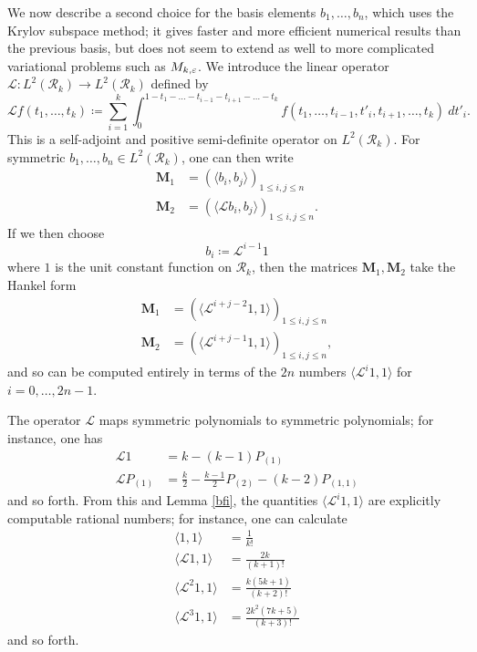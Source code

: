 We now describe a second choice for the basis elements $b_1,\dots,b_n$, which uses the Krylov subspace method; it gives faster and more efficient numerical results than the previous basis, but does not seem to extend as well to more complicated variational problems such as $M_{k,\varepsilon}$.  We introduce the linear operator ${\mathcal L}: L^2({\mathcal R}_k) \to L^2({\mathcal R}_k)$ defined by
$$ {\mathcal L} f( t_1,\dots,t_k) \coloneqq \sum_{i=1}^k \int_0^{1-t_1-\dots-t_{i-1}-t_{i+1}-\dots-t_k} f(t_1,\dots,t_{i-1},t'_i,t_{i+1},\dots,t_k)\ dt'_i.$$
This is a self-adjoint and positive semi-definite operator on $L^2({\mathcal R}_k)$.  For symmetric $b_1,\dots,b_n \in L^2({\mathcal R}_k)$, one can then write
\begin{align*}
\mathbf{M}_1 &= \left( \langle b_i, b_j \rangle \right)_{1 \leq i,j \leq n} \\
\mathbf{M}_2 &= \left( \langle {\mathcal L} b_i, b_j \rangle \right)_{1 \leq i,j \leq n}.
\end{align*}
If we then choose
$$ b_i \coloneqq {\mathcal L}^{i-1} 1$$
where $1$ is the unit constant function on ${\mathcal R}_k$, then the matrices $\mathbf{M}_1,\mathbf{M}_2$ take the Hankel form
\begin{align*}
\mathbf{M}_1 &= \left( \langle {\mathcal L}^{i+j-2} 1, 1 \rangle \right)_{1 \leq i,j \leq n} \\
\mathbf{M}_2 &= \left( \langle {\mathcal L}^{i+j-1} 1, 1 \rangle \right)_{1 \leq i,j \leq n},
\end{align*}
and so can be computed entirely in terms of the $2n$ numbers $\langle {\mathcal L}^i 1, 1 \rangle$ for $i=0,\dots,2n-1$.

The operator ${\mathcal L}$ maps symmetric polynomials to symmetric polynomials; for instance, one has
\begin{align*}
{\mathcal L} 1 &= k - (k-1) 	P_{(1)} \\
{\mathcal L} P_{(1)} &= \frac{k}{2} - \frac{k-1}{2} P_{(2)} - (k-2) P_{(1,1)}
\end{align*}
and so forth.  From this and Lemma \ref{bfi}, the quantities $\langle {\mathcal L}^i 1, 1 \rangle$ are explicitly computable rational numbers; for instance, one can calculate
\begin{align*}
\langle 1, 1 \rangle &= \frac{1}{k!} \\
\langle {\mathcal L} 1, 1\rangle &= \frac{2k}{(k+1)!} \\
\langle {\mathcal L}^2 1, 1\rangle &= \frac{k (5k+1)}{(k+2)!} \\
\langle {\mathcal L}^3 1, 1\rangle &= \frac{2k^2 (7k+5)}{(k+3)!}
\end{align*}
and so forth.

